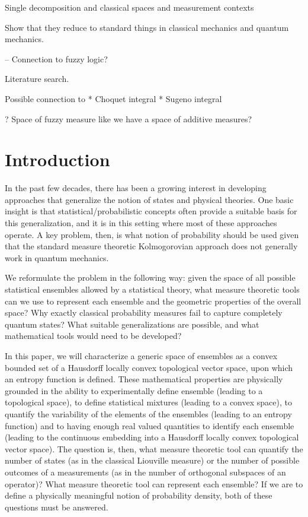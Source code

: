 \documentclass[10pt,twocolumn, nofootinbib]{revtex4-2}
\begin{document}
Single decomposition and classical spaces and measurement contexts

Show that they reduce to standard things in classical mechanics and quantum mechanics.

-- Connection to fuzzy logic?

Literature search.

Possible connection to
* Choquet integral
* Sugeno integral

? Space of fuzzy measure like we have a space of additive measures?


\section{Introduction}

In the past few decades, there has been a growing interest in developing approaches that generalize the notion of states and physical theories. One basic insight is that statistical/probabilistic concepts often provide a suitable basis for this generalization, and it is in this setting where most of these approaches operate. A key problem, then, is what notion of probability should be used given that the standard measure theoretic Kolmogorovian approach does not generally work in quantum mechanics.

We reformulate the problem in the following way: given the space of all possible statistical ensembles allowed by a statistical theory, what measure theoretic tools can we use to represent each ensemble and the geometric properties of the overall space? Why exactly classical probability measures fail to capture completely quantum states? What suitable generalizations are possible, and what mathematical tools would need to be developed?

In this paper, we will characterize a generic space of ensembles as a convex bounded set of a Hausdorff locally convex topological vector space, upon which an entropy function is defined. These mathematical properties are physically grounded in the ability to experimentally define ensemble (leading to a topological space), to define statistical mixtures (leading to a convex space), to quantify the variability of the elements of the ensembles (leading to an entropy function) and to having enough real valued quantities to identify each ensemble (leading to the continuous embedding into a Hausdorff locally convex topological vector space). The question is, then, what measure theoretic tool can quantify the number of states (as in the classical Liouville measure) or the number of possible outcomes of a measurements (as in the number of orthogonal subspaces of an operator)? What measure theoretic tool can represent each ensemble? If we are to define a physically meaningful notion of probability density, both of these questions must be answered.
\end{document}
